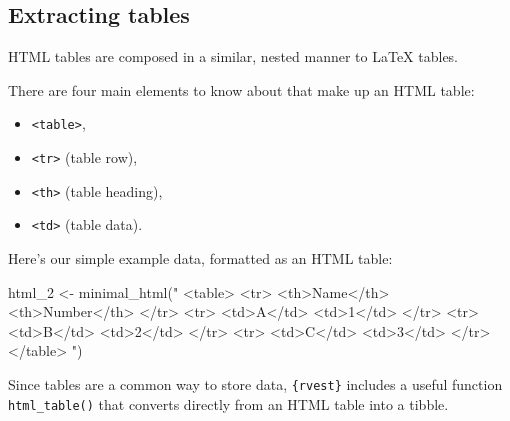 \documentclass[
  letterpaper,
  DIV=11,
  numbers=noendperiod]{scrreprt}
\newenvironment{Shaded}{\begin{snugshade}}{\end{snugshade}}
\newcommand{\FunctionTok}[1]{\textcolor[rgb]{0.28,0.35,0.67}{#1}}
\newcommand{\NormalTok}[1]{\textcolor[rgb]{0.00,0.23,0.31}{#1}}
\newcommand{\OtherTok}[1]{\textcolor[rgb]{0.00,0.23,0.31}{#1}}
\newcommand{\StringTok}[1]{\textcolor[rgb]{0.13,0.47,0.30}{#1}}
\providecommand{\tightlist}{%
  \setlength{\itemsep}{0pt}\setlength{\parskip}{0pt}}\usepackage{longtable,booktabs,array}
\begin{document}
\subsection{Extracting tables}\label{extracting-tables}

HTML tables are composed in a similar, nested manner to LaTeX tables.

There are four main elements to know about that make up an HTML table:

\begin{itemize}
\tightlist
\item
  \texttt{\textless{}table\textgreater{}},
\item
  \texttt{\textless{}tr\textgreater{}} (table row),
\item
  \texttt{\textless{}th\textgreater{}} (table heading),
\item
  \texttt{\textless{}td\textgreater{}} (table data).
\end{itemize}

Here's our simple example data, formatted as an HTML table:

\begin{Shaded}
\begin{Highlighting}[]
\NormalTok{html\_2 }\OtherTok{\textless{}{-}} \FunctionTok{minimal\_html}\NormalTok{(}\StringTok{"}
\StringTok{  \textless{}table\textgreater{}}
\StringTok{    \textless{}tr\textgreater{}}
\StringTok{      \textless{}th\textgreater{}Name\textless{}/th\textgreater{}}
\StringTok{      \textless{}th\textgreater{}Number\textless{}/th\textgreater{}}
\StringTok{    \textless{}/tr\textgreater{}}
\StringTok{    \textless{}tr\textgreater{}}
\StringTok{      \textless{}td\textgreater{}A\textless{}/td\textgreater{}}
\StringTok{      \textless{}td\textgreater{}1\textless{}/td\textgreater{}}
\StringTok{    \textless{}/tr\textgreater{}}
\StringTok{    \textless{}tr\textgreater{}}
\StringTok{      \textless{}td\textgreater{}B\textless{}/td\textgreater{}}
\StringTok{      \textless{}td\textgreater{}2\textless{}/td\textgreater{}}
\StringTok{    \textless{}/tr\textgreater{}}
\StringTok{    \textless{}tr\textgreater{}}
\StringTok{      \textless{}td\textgreater{}C\textless{}/td\textgreater{}}
\StringTok{      \textless{}td\textgreater{}3\textless{}/td\textgreater{}}
\StringTok{    \textless{}/tr\textgreater{}}
\StringTok{  \textless{}/table\textgreater{}}
\StringTok{  "}\NormalTok{)}
\end{Highlighting}
\end{Shaded}

Since tables are a common way to store data, \texttt{\{rvest\}} includes
a useful function \texttt{html\_table()} that converts directly from an
HTML table into a tibble.
\end{document}
